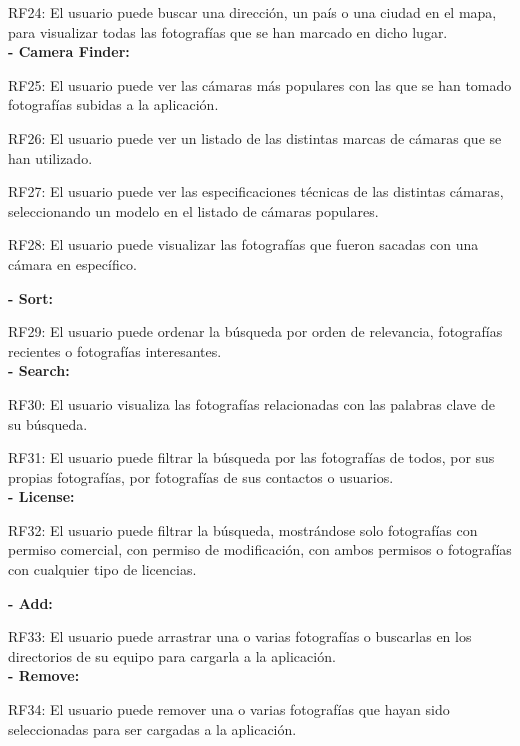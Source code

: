 \documentclass{memoria}
\begin{document}
RF24: El usuario puede buscar una dirección, un país o una ciudad  en el mapa, para visualizar todas las fotografías que se han marcado en dicho lugar.\\

\textbf{- Camera Finder:}

RF25: El usuario puede ver las cámaras más populares con las que se han tomado fotografías subidas a la aplicación.

RF26: El usuario puede ver un listado de las distintas marcas de cámaras que se han utilizado.

RF27: El usuario puede ver las especificaciones técnicas de las distintas cámaras, seleccionando un modelo en el listado de cámaras populares.

RF28: El usuario puede visualizar las fotografías que fueron sacadas con una cámara en específico.\\


\textbf{- Sort:} 

RF29: El usuario puede ordenar la búsqueda por orden de relevancia, fotografías recientes o fotografías interesantes.\\

\textbf{- Search:}

RF30: El usuario visualiza las fotografías relacionadas con las palabras clave de su búsqueda.

RF31: El usuario puede filtrar la búsqueda por las fotografías de todos, por sus propias fotografías, por fotografías de sus contactos o usuarios.\\

\textbf{- License:}

RF32: El usuario puede filtrar la búsqueda, mostrándose solo fotografías con permiso comercial, con permiso de modificación, con ambos permisos o fotografías con cualquier tipo de licencias.\\


\textbf{- Add:}

RF33: El usuario puede arrastrar una o varias fotografías o buscarlas en los directorios de su equipo para cargarla a la aplicación.\\

\textbf{- Remove:} 

RF34: El usuario puede remover una o varias fotografías que hayan sido seleccionadas para ser cargadas a la aplicación.\\ 
\end{document}
